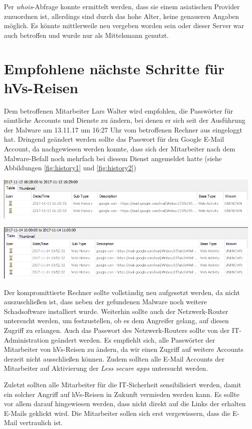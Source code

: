 Per \textit{whois}-Abfrage konnte ermittelt werden, dass sie einem asiatischen Provider zuzuordnen ist, allerdings sind durch das hohe Alter, keine genaueren Angaben möglich. Es könnte mittlerweile neu vergeben worden sein oder dieser Server war auch betroffen und wurde nur als Mittelsmann genutzt.

\chapter{Empfohlene nächste Schritte für hVs-Reisen}

Dem betroffenen Mitarbeiter Lars Walter wird empfohlen, die Passwörter für sämtliche Accounts und Dienste zu ändern, bei denen er sich seit der Ausführung der Malware am 13.11.17 um 16:27 Uhr vom betroffenen Rechner aus eingeloggt hat.
Dringend geändert werden sollte das Passwort für den Google E-Mail Account, da nachgewiesen werden konnte, dass sich der Mitarbeiter nach dem Malware-Befall noch mehrfach bei diesem Dienst angemeldet hatte (siehe Abbildungen \ref{fig:history1} und \ref{fig:history2})

\begin{center}
	\includegraphics[width=15.8cm]{figures/history1.PNG}
	\label{fig:history1}
\end{center}

\begin{center}
	\includegraphics[width=15.8cm]{figures/history2.PNG}
	\label{fig:history2}
\end{center}

Der kompromittierte Rechner sollte vollständig neu aufgesetzt werden, da nicht auszuschließen ist, dass neben der gefundenen Malware noch weitere Schadsoftware installiert wurde.
Weiterhin sollte auch der Netzwerk-Router untersucht werden, um festzustellen, ob es dem Angreifer gelang, auf diesen Zugriff zu erlangen.
Auch das Passwort des Netzwerk-Routers sollte von der IT-Administration geändert werden.
Es empfiehlt sich, alle Passwörter der Mitarbeiter von hVs-Reisen zu ändern, da wir einen Zugriff auf weitere Accounts derzeit nicht ausschließen können.
Zudem sollten alle E-Mail Accounts der Mitarbeiter auf Aktivierung der \textit{Less secure apps} untersucht werden.

Zuletzt sollten alle Mitarbeiter für die IT-Sicherheit sensibilisiert werden, damit ein solcher Angriff auf hVs-Reisen in Zukunft vermieden werden kann.
Es sollte vor allem darauf hingewiesen werden, dass nicht direkt auf die Links der erhalten E-Mails geklickt wird.
Die Mitarbeiter sollen sich erst vergewissern, dass die E-Mail vertraulich ist.
